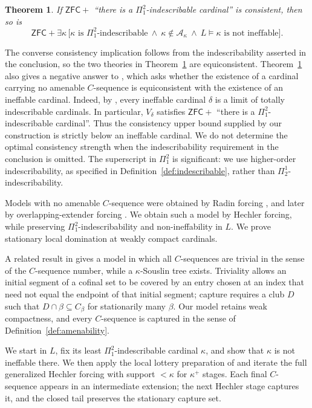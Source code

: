 \documentclass[10pt,a4paper]{amsart}
\newtheorem{theorem}{Theorem}[section]
\theoremstyle{definition}
\theoremstyle{remark}
\newcommand{\A}{\mathcal A}
\newcommand{\ZFC}{\mathsf{ZFC}}
\begin{document}
\begin{theorem}\label{thm:main}
If \(\ZFC+\) ``there is a \(\Pi^2_1\)-indescribable cardinal''
is consistent, then so is
\[
 \ZFC+\exists\kappa\,
 \bigl[\kappa\text{ is }\Pi^2_1\text{-indescribable}
       \ \land\ \kappa\notin\A_\kappa
       \ \land\ L\models\text{\(\kappa\) is not ineffable}\bigr].
\]
\end{theorem}

The converse consistency implication follows from the
indescribability asserted in the conclusion, so the two
theories in Theorem~\ref{thm:main} are equiconsistent.
Theorem~\ref{thm:main} also gives a negative answer to
\cite[Question~5.5]{BNZRad}, which asks whether the existence
of a cardinal carrying no amenable \(C\)-sequence is
equiconsistent with the existence of an ineffable cardinal.
Indeed, by \cite[Lemma~5.4]{HLN}, every ineffable cardinal
\(\delta\) is a limit of totally indescribable cardinals.
In particular, \(V_\delta\) satisfies \(\ZFC+\) ``there is
a \(\Pi^2_1\)-indescribable cardinal''. Thus the consistency
upper bound supplied by our construction is strictly below
an ineffable cardinal. We do not determine the optimal
consistency strength when the indescribability requirement
in the conclusion is omitted. The superscript in \(\Pi^2_1\)
is significant: we use higher-order indescribability,
as specified in Definition~\ref{def:indescribable},
rather than \(\Pi^1_2\)-indescribability.

Models with no amenable \(C\)-sequence were obtained by Radin
forcing \cite{BNZRad}, and later by overlapping-extender
forcing \cite{BNZApprox}. We obtain such a model by Hechler
forcing, while preserving \(\Pi^2_1\)-indescribability and
non-ineffability in \(L\). We prove stationary local
domination at weakly compact cardinals.

A related result in \cite{RYY} gives a model in which all
\(C\)-sequences are trivial in the sense of the
\(C\)-sequence number, while a \(\kappa\)-Souslin tree
exists. Triviality allows an initial segment of a cofinal
set to be covered by an entry chosen at an index that need
not equal the endpoint of that initial segment;
capture requires a club \(D\) such that
\(D\cap\beta\subseteq C_\beta\) for stationarily many
\(\beta\). Our model retains weak
compactness, and every \(C\)-sequence is captured in the
sense of Definition~\ref{def:amenability}.

We start in \(L\), fix its least
\(\Pi^2_1\)-indescribable cardinal \(\kappa\), and
show that \(\kappa\) is not ineffable there. We then
apply the local lottery preparation of \cite{Johnstone} and iterate
the full generalized Hechler forcing with support
\(<\kappa\) for \(\kappa^+\) stages. Each final
\(C\)-sequence appears in an intermediate extension;
the next Hechler stage captures it, and the closed tail
preserves the stationary capture set.
\end{document}
